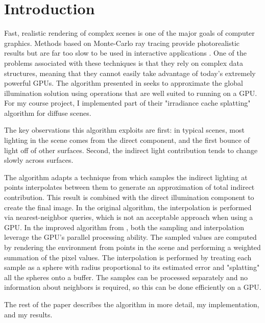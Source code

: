 \documentclass[10pt,twopage]{acmsiggraph}
\begin{document}
\section{Introduction}
\label{Intro}

Fast, realistic rendering of complex scenes is one of the major goals of computer graphics.  Methods based on Monte-Carlo ray tracing provide photorealistic results but are far too slow to be used in interactive applications \cite{cook1984distributed}.  One of the problems associated with these techniques is that they rely on complex data structures, meaning that they cannot easily take advantage of today's extremely powerful GPUs.  The algorithm presented in \cite{mainpaper} seeks to approximate the global illumination solution using operations that are well suited to running on a GPU.  For my course project, I implemented part of their "irradiance cache splatting" algorithm for diffuse scenes.

The key observations this algorithm exploits are first: in typical scenes, most lighting in the scene comes from the direct component, and the first bounce of light off of other surfaces.  Second, the indirect light contribution tends to change slowly across surfaces.  

The algorithm adapts a technique from \cite{ward1988ray} which samples the indirect lighting at points interpolates between them to generate an approximation of total indirect contribution.  This result is combined with the direct illumination component to create the final image.  In the original algorithm, the interpolation is performed via nearest-neighbor queries, which is not an acceptable approach when using a GPU.  In the improved algorithm from \cite{mainpaper}, both the sampling and interpolation leverage the GPU's parallel processing ability.  The sampled values are computed by rendering the environment from points in the scene and performing a weighted summation of the pixel values.  The interpolation is performed by treating each sample as a sphere with radius proportional to its estimated error and "splatting" all the spheres onto a buffer.  The samples can be processed separately and no information about neighbors is required, so this can be done efficiently on a GPU.

The rest of the paper describes the algorithm in more detail, my implementation, and my results.
\end{document}
